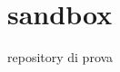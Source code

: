 \chapter{sandbox }
\hypertarget{md__r_e_a_d_m_e}{}\label{md__r_e_a_d_m_e}
\label{md__r_e_a_d_m_e_autotoc_md0}%
%


repository di prova 